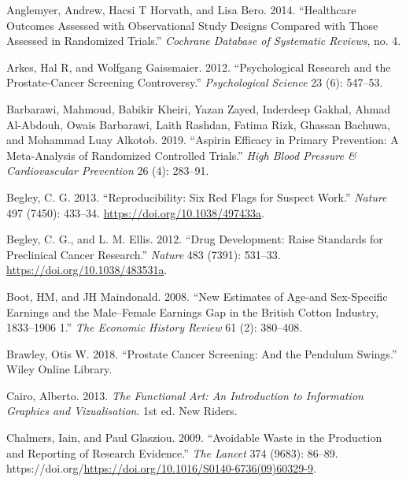 \documentclass[
  10pt,
  b5paper]{book}
\newlength{\cslhangindent}
\newlength{\cslentryspacingunit} %
\newenvironment{CSLReferences}[2] %
 {%
  \setlength{\parindent}{0pt}
  \ifodd #1
  \let\oldpar\par
  \def\par{\hangindent=\cslhangindent\oldpar}
  \fi
  \setlength{\parskip}{#2\cslentryspacingunit}
 }%
 {}
\begin{document}
\hypertarget{refs}{}
\begin{CSLReferences}{1}{0}
\leavevmode{}%
Anglemyer, Andrew, Hacsi T Horvath, and Lisa Bero. 2014. {``Healthcare Outcomes Assessed with Observational Study Designs Compared with Those Assessed in Randomized Trials.''} \emph{Cochrane Database of Systematic Reviews}, no. 4.

\leavevmode{}%
Arkes, Hal R, and Wolfgang Gaissmaier. 2012. {``Psychological Research and the Prostate-Cancer Screening Controversy.''} \emph{Psychological Science} 23 (6): 547--53.

\leavevmode{}%
Barbarawi, Mahmoud, Babikir Kheiri, Yazan Zayed, Inderdeep Gakhal, Ahmad Al-Abdouh, Owais Barbarawi, Laith Rashdan, Fatima Rizk, Ghassan Bachuwa, and Mohammad Luay Alkotob. 2019. {``Aspirin Efficacy in Primary Prevention: A Meta-Analysis of Randomized Controlled Trials.''} \emph{High Blood Pressure \& Cardiovascular Prevention} 26 (4): 283--91.

\leavevmode{}%
Begley, C. G. 2013. {``Reproducibility: Six Red Flags for Suspect Work.''} \emph{Nature} 497 (7450): 433--34. \url{https://doi.org/10.1038/497433a}.

\leavevmode{}%
Begley, C. G., and L. M. Ellis. 2012. {``Drug Development: Raise Standards for Preclinical Cancer Research.''} \emph{Nature} 483 (7391): 531--33. \url{https://doi.org/10.1038/483531a}.

\leavevmode{}%
Boot, HM, and JH Maindonald. 2008. {``New Estimates of Age-and Sex-Specific Earnings and the Male--Female Earnings Gap in the British Cotton Industry, 1833--1906 1.''} \emph{The Economic History Review} 61 (2): 380--408.

\leavevmode{}%
Brawley, Otis W. 2018. {``Prostate Cancer Screening: And the Pendulum Swings.''} Wiley Online Library.

\leavevmode{}%
Cairo, Alberto. 2013. \emph{The Functional Art: An Introduction to Information Graphics and Vizualisation}. 1st ed. New Riders.

\leavevmode{}%
Chalmers, Iain, and Paul Glasziou. 2009. {``Avoidable Waste in the Production and Reporting of Research Evidence.''} \emph{The Lancet} 374 (9683): 86--89. https://doi.org/\url{https://doi.org/10.1016/S0140-6736(09)60329-9}.


\end{CSLReferences}
\end{document}
